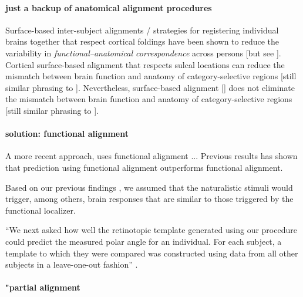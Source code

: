 \paragraph{just a backup of anatomical alignment procedures}
%
Surface-based inter-subject alignments / strategies for registering individual
brains together that respect cortical foldings \citep{fischl1999cortical,
yeo2009spherical} have been shown to reduce the variability in
\textit{functional--anatomical correspondence} \citep{feilong2018reliable,
kumar2020brainiak} across persons \citep{klein2010evaluation,
frost2012measuring} [but see \citep{langers2014assessment}].
%
Cortical surface-based alignment \citep{fischl2012freesurfer} that respects
sulcal locations can reduce the mismatch between brain function and anatomy of
category-selective regions \citep{duncan2009consistency, frost2012measuring,
weiner2018defining, weiner2014mid} [still similar phrasing to
\citep{feilong2018reliable}].
%
Nevertheless, surface-based alignment [\citep{fischl2012freesurfer}] does not
eliminate the mismatch between brain function and anatomy of category-selective
regions \citep{duncan2009consistency, frost2012measuring, weiner2018defining,
weiner2014mid}[still similar phrasing to \citep{feilong2018reliable}].

\paragraph{solution: functional alignment}
%
A more recent approach, uses functional alignment \citep{haxby2020hyperalignment,
bazeille2021empirical} ...
%
Previous results has shown that prediction using functional alignment
outperforms functional alignment.

Based on our previous findings \citep{haeusler2022processing}, we assumed that
the naturalistic stimuli would trigger, among others, brain responses that are
similar to those triggered by the functional localizer.


``We next asked how well the retinotopic template generated using our procedure
could predict the measured polar angle for an individual. For each subject, a
template to which they were compared was constructed using data from all other
subjects in a leave-one-out fashion'' \citep{benson2012retinotopic}.


\paragraph{"partial alignment}

